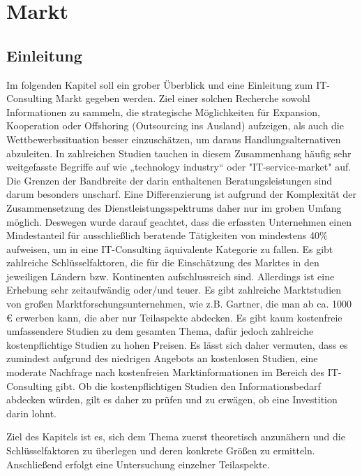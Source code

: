 \chapter{Markt}
\section{Einleitung}
Im folgenden Kapitel soll ein grober Überblick und eine Einleitung zum IT-Consulting Markt gegeben werden. 
Ziel einer solchen Recherche sowohl Informationen zu sammeln, die strategische Möglichkeiten für Expansion, Kooperation oder Offshoring (Outsourcing ins Ausland)  aufzeigen, 
als auch die Wettbewerbssituation besser einzuschätzen, um daraus Handlungsalternativen abzuleiten. 
In zahlreichen Studien tauchen in diesem Zusammenhang häufig sehr weitgefasste Begriffe auf wie „technology industry“ oder "IT-service-market" auf. 
Die Grenzen der Bandbreite der darin enthaltenen Beratungsleistungen sind darum besonders unscharf. Eine Differenzierung ist aufgrund der Komplexität der Zusammensetzung des Dienstleistungsspektrums daher nur im groben Umfang möglich.
Deswegen wurde darauf geachtet, dass die erfassten Unternehmen einen Mindestanteil  für ausschließlich beratende Tätigkeiten von mindestens 40\%  aufweisen, um in eine IT-Consulting äquivalente Kategorie zu fallen.
Es gibt zahlreiche Schlüsselfaktoren, die für die Einschätzung des Marktes in den jeweiligen Ländern bzw. Kontinenten aufschlussreich sind. 
Allerdings ist eine Erhebung sehr zeitaufwändig oder/und teuer. Es gibt zahlreiche Marktstudien von großen Marktforschungsunternehmen, wie z.B. Gartner, die man ab ca. 1000 €  erwerben kann, die aber nur Teilaspekte abdecken. 
Es gibt kaum kostenfreie umfassendere Studien zu dem gesamten Thema, dafür jedoch zahlreiche kostenpflichtige Studien zu hohen Preisen. Es lässt sich daher vermuten, dass es zumindest aufgrund des niedrigen Angebots an kostenlosen Studien, eine moderate Nachfrage nach kostenfreien Marktinformationen im Bereich des IT-Consulting gibt. Ob die kostenpflichtigen Studien den Informationsbedarf abdecken würden, gilt es daher zu prüfen und zu erwägen, ob eine Investition darin lohnt.

 Ziel des Kapitels ist es, sich dem  Thema zuerst theoretisch anzunähern und die Schlüsselfaktoren zu überlegen und deren konkrete Größen zu ermitteln. Anschließend erfolgt eine Untersuchung einzelner Teilaspekte.


